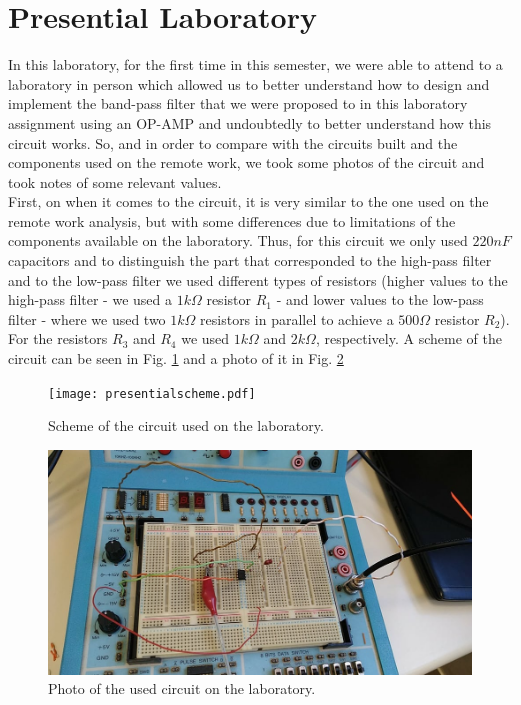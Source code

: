 \section{Presential Laboratory}
In this laboratory, for the first time in this semester, we were able to attend to a laboratory in person which allowed us to better understand how to design and implement the band-pass filter that we were proposed to in this laboratory assignment using an OP-AMP and undoubtedly to better understand how this circuit works. So, and in order to compare with the circuits built and the components used on the remote work, we took some photos of the circuit and took notes of some relevant values.\\

First, on when it comes to the circuit, it is very similar to the one used on the remote work analysis, but with some differences due to limitations of the components available on the laboratory. Thus, for this circuit we only used $220nF$ capacitors and to distinguish the part that corresponded to the high-pass filter and to the low-pass filter we used different types of resistors (higher values to the high-pass filter - we used a $1k\Omega$ resistor $R_1$ - and lower values to the low-pass filter - where we used two $1k\Omega$ resistors in parallel to achieve a $500\Omega$ resistor $R_2$). For the resistors $R_3$ and $R_4$ we used $1k\Omega$ and $2k\Omega$, respectively. A scheme of the circuit can be seen in Fig. \ref{fig:esquemalab} and a photo of it in Fig. \ref{fig:fotolab}

\begin{figure}[H]
    \centering
    \texttt{[image: presentialscheme.pdf]}
    \caption{Scheme of the circuit used on the laboratory.}
    \label{fig:esquemalab}
\end{figure}

\begin{figure}[H]
    \centering
    \includegraphics[width=\linewidth]{fotolab.jpg}
    \caption{Photo of the used circuit on the laboratory.}
    \label{fig:fotolab}
\end{figure}

